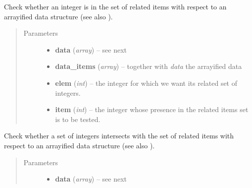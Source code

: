 \documentclass[letterpaper,10pt,english]{sphinxmanual}
\begin{document}
\begin{fulllineitems}

\begin{fulllineitems}
\label{graf/graf:graf.task.GrafTask.hasitem}
Check whether an integer is in the set of related items
with respect to an arrayified data structure (see also {\hyperref[graf/graf:graf.task.GrafTask.getitems]{}}).
\begin{quote}\begin{description}
\item[{Parameters}] \leavevmode\begin{itemize}
\item {} 
\textbf{data} (\emph{array}) --
see next

\item {} 
\textbf{data\_items} (\emph{array}) --
together with \emph{data} the arrayified data

\item {} 
\textbf{elem} (\emph{int}) --
the integer for which we want its related set of integers.

\item {} 
\textbf{item} (\emph{int}) --
the integer whose presence in the related items set is to be tested.

\end{itemize}

\end{description}\end{quote}

\end{fulllineitems}


\begin{fulllineitems}
\label{graf/graf:graf.task.GrafTask.hasitems}
Check whether a set of integers intersects with the set of related items
with respect to an arrayified data structure (see also {\hyperref[graf/graf:graf.task.GrafTask.getitems]{}}).
\begin{quote}\begin{description}
\item[{Parameters}] \leavevmode\begin{itemize}
\item {} 
\textbf{data} (\emph{array}) --
see next


\end{itemize}
\end{description}
\end{quote}
\end{fulllineitems}
\end{fulllineitems}
\end{document}
